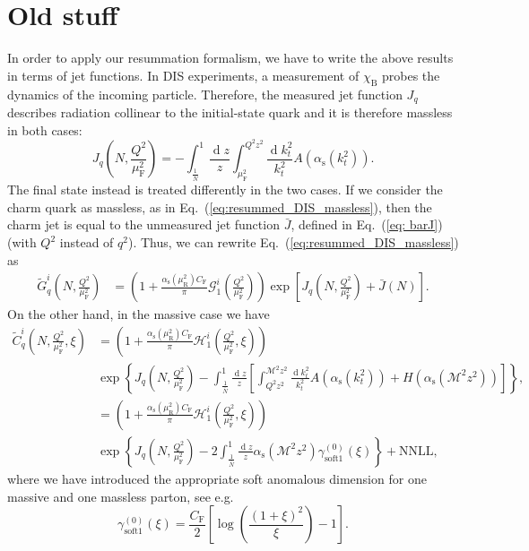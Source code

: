 \documentclass[letterpaper,11pt]{article}
\newcommand{\as}{\alpha_\text{s}}
\newcommand{\cf}{C_{\text{F}}}
\DeclareMathOperator{\De}{d}
\newcommand{\de}{\De\!}
\newcommand{\gszeroMm}{\gamma_\text{soft1}^{(0)}}
\newcommand{\muf}{\mu_{\text{F}}}
\newcommand{\mur}{\mu_{\text{R}}}
\begin{document}
\section{Old stuff}
In order to apply our resummation formalism, we have to write the above results in terms of jet functions. 
%
In DIS experiments, a measurement of $\chi_\text{B}$ probes the dynamics of the incoming particle.
%
Therefore, the measured jet function $J_q$ describes radiation collinear to the initial-state quark and it is therefore massless in both cases:
\begin{equation}\label{eq:massless-jet-function}
J_q\left(N,\frac{Q^2}{\muf^2}\right)=-\int^{1}_{{\frac{1}{ \bar N}}} \frac{\de z}{z} \int^{Q^2 z^2}_{\muf^2} \frac{\de k_t^2}{k_t^2} A\left(\as(k_t^2)\right).
\end{equation}
%
The final state instead is treated differently in the two cases. If we consider the charm quark as massless, as in Eq.~(\ref{eq:resummed_DIS_massless}), then the charm jet is equal to the unmeasured jet function $\bar J$, defined in Eq.~(\ref{eq: barJ}) (with $Q^2$ instead of $q^2$). Thus, we can rewrite Eq.~(\ref{eq:resummed_DIS_massless}) as
\begin{align}\label{eq:resummed_DIS_massless_bis}
\widetilde{G}^{i}_q\left(N,\frac{Q^2}{\muf^2}\right)&
=\left(1+ \frac{\as(\mur^2)\cf }{\pi}\mathcal{G}^i_1\left(\frac{Q^2}{\muf^2}\right)\right) \exp\left [ J_q\left(N,\frac{Q^2}{\muf^2}\right)+\bar J(N)\right].
\end{align}
On the other hand, in the massive case we have 
\begin{align}\label{eq:resummed_DIS_massive_bis}
\widetilde{C}^i_q\left(N,\frac{Q^2}{\muf^2},\xi\right)&= \left(1+ \frac{\as(\mur^2)\cf }{\pi}\mathcal{H}^i_1\left(\frac{Q^2}{\muf^2},\xi\right)\right) \nonumber \\
&
\exp\left\{J_q\left(N,\frac{Q^2}{\muf^2}\right)-\int^{1}_{\frac{1}{\bar N}} \frac{\de z}{z} \left[\int^{\mathcal{M}^2 z^2}_{Q^2 z^2} \frac{\de k_t^2}{k_t^2} A\left(\as(k_t^2)\right)+H\left(\as\left(\mathcal{M}^2z^2\right)\right)\right]\right\},
\nonumber\\
&= \left(1+ \frac{\as(\mur^2)\cf }{\pi}\mathcal{H}^i_1\left(\frac{Q^2}{\muf^2},\xi\right)\right) \nonumber \\
&
\exp\left\{J_q\left(N,\frac{Q^2}{\muf^2}\right)-2 \int^{1}_{\frac{1}{\bar N}} \frac{\de z}{z}  \as\left(\mathcal{M}^2z^2\right)
	\gszeroMm(\xi)\right\}+\text{NNLL},
\end{align}
where we have introduced the appropriate soft anomalous dimension for one massive and one massless parton, see e.g.~\cite{Kidonakis:2020gxo}  
\begin{equation}
 	\gszeroMm(\xi)=\frac{\cf}{2}\left[\log{\left(\frac{(1+\xi)^2}{\xi}\right)}-1\right].
 \end{equation} 
\end{document}
